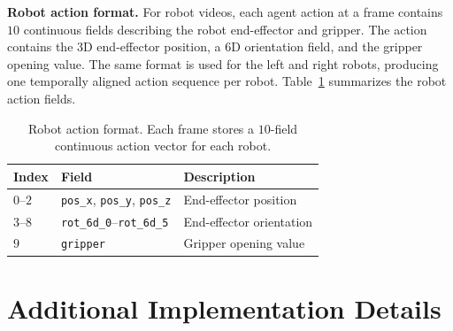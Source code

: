 \documentclass{llmxive}
\providecommand{\arraystretch}{1.12}
\begin{document}
\noindent\textbf{Robot action format.}
For robot videos, each agent action at a frame contains $10$ continuous fields describing the robot end-effector and gripper.
The action contains the 3D end-effector position, a 6D orientation field, and the gripper opening value.
The same format is used for the left and right robots, producing one temporally aligned action sequence per robot.
Table~\ref{tab:robot-action-format} summarizes the robot action fields.

\begin{table}[t]
  \centering
  \footnotesize
  \vspace{4pt}
  \setlength{\tabcolsep}{4pt}
  \renewcommand{\arraystretch}{1.12}
  \begin{tabular}{@{}lll@{}}
    \toprule
    \textbf{Index} & \textbf{Field} & \textbf{Description} \\
    \midrule
    $0$--$2$ & \texttt{pos\_x}, \texttt{pos\_y}, \texttt{pos\_z} & End-effector position \\
    $3$--$8$ & \texttt{rot\_6d\_0}--\texttt{rot\_6d\_5} & End-effector orientation \\
    $9$ & \texttt{gripper} & Gripper opening value \\
    \bottomrule
  \end{tabular}
\caption{Robot action format. Each frame stores a $10$-field continuous action vector for each robot.}
\label{tab:robot-action-format}
\end{table}


\section{Additional Implementation Details}
\label{app:additional_implementation_details}
\end{document}
